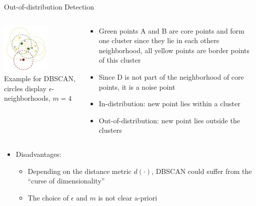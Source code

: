 \documentclass[11pt,compress,t,notes=noshow, aspectratio=169, xcolor=table]{beamer}
\begin{document}
\begin{frame}[c]{Out-of-distribution Detection}
\vspace{-0.6cm}
\begin{columns}[totalwidth=\textwidth]

	\begin{column}{0.5\textwidth}
	    \vspace{-2em}
		\begin{center}
			\includegraphics[width=0.6\textwidth]{figure/dbscan.jpg}\\
			\tiny{Example for DBSCAN, circles display $\epsilon$-neighborhoods, $m = 4$}
		\end{center}
	\end{column}

	\begin{column}{0.5\textwidth}
	
		\begin{itemize}
			\item Green points A and B are core points and form one cluster since they lie in each others neighborhood, all yellow points are border points of this cluster 
			\pause
			\item Since D is not part of the neighborhood of core points, it is a noise point 
			\pause
			\item In-distribution: new point lies within a cluster
			\pause
		    \item Out-of-distribution: new point lies outside the clusters 
		\end{itemize}
	\end{column}

\end{columns}

\pause

\hspace{1em}
\begin{itemize}
		\item Disadvantages:
		\begin{itemize}
		    \item Depending on the distance metric $d(\cdot)$, DBSCAN could suffer from the ``curse of dimensionality'' 
		    \item The choice of $\epsilon$ and $m$ is not clear a-priori 
		\end{itemize}
\end{itemize}
\end{frame}
\end{document}
